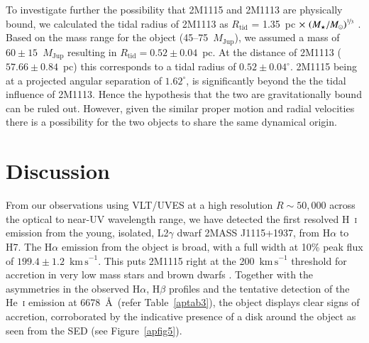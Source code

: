 \documentclass{aa}
\newcommand{\mj}{\ensuremath{M_\mathrm{Jup}}\xspace}
\newcommand{\msun}{\ensuremath{M_\odot}\xspace}
\newcommand{\Mstar}{\ensuremath{M_\star}\xspace}
\newcommand{\Ha}{\ensuremath{\mathrm{H}\alpha}\xspace}
\newcommand{\Hb}{\ensuremath{\mathrm{H}\beta}\xspace}
\newcommand{\Hi}{H~\textsc{i}\xspace}
\newcommand{\Hei}{He~\textsc{i}\xspace}
\newcommand{\kms}{\ensuremath{\mathrm{km\,s}^{-1}}\xspace}
\begin{document}
To investigate further the possibility that 2M1115 and 2M1113 are physically bound, we calculated the tidal radius of 2M1113 as $R_{\mathrm{tid}}$ = 1.35~pc $\times\,\left(
\Mstar/\msun\right)^{\nicefrac{1}{3}}$ \citep{jiang2010, mamajek2013}. Based on the \cite{theissen2018} mass range for the object (45--75~\mj), we assumed a mass of $60\pm15$~\mj resulting in $R_\mathrm{{tid}}=0.52\pm0.04$~pc. At the distance of 2M1113 ($57.66\pm0.84$~pc) this corresponds to a tidal radius of $0.52\pm0.04^{\circ}$. 2M1115 being at a projected angular separation of $1.62^{\circ}$, is significantly beyond the the tidal influence of 2M1113. Hence the hypothesis that the two are gravitationally bound can be ruled out. However, given the similar proper motion and radial velocities \citep[RV$=-10.1\pm0.3$~\kms for 2M1113;][]{theissen2018} there is a possibility for the two objects to share the same dynamical origin.

\section{Discussion} \label{disc}

From our observations using VLT/UVES at a high resolution $R\sim50,000$ across the optical to near-UV wavelength range, we have detected the first resolved \Hi emission from the young, isolated, L2$\gamma$ dwarf 2MASS J1115+1937, from \Ha to H7. The \Ha emission from the object is broad, with a full width at 10\% peak flux of $199.4\pm1.2$~\kms. This puts 2M1115 right at the 200~\kms threshold for accretion in very low mass stars and brown dwarfs \citep{mohanty2005}. Together with the asymmetries in the observed \Ha, \Hb profiles and the tentative detection of the \Hei emission at 6678~\AA\ (refer Table~\ref{aptab3}), the object displays clear signs of accretion, corroborated by the indicative presence of a disk around the object as seen from the SED (see Figure~\ref{apfig5}). 
\end{document}
